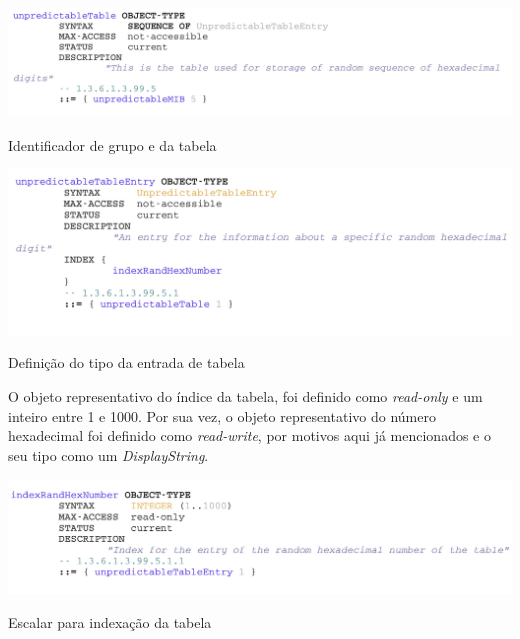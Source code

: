 \begin{center}
 	
 	\includegraphics[width=\textwidth,height=\textheight,keepaspectratio]{resources/images/faseA/mib/tables/table.png}
 	\captionsetup{type=figure, width=0.8\linewidth}
	\caption{Identificador de grupo e da tabela}
\label{fig:fasea:} 
\end{center}

\begin{center}
 	
 	\includegraphics[width=\textwidth,height=\textheight,keepaspectratio]{resources/images/faseA/mib/tables/tableentry.png}
 	\captionsetup{type=figure, width=0.8\linewidth}
	\caption{Definição do tipo da entrada de tabela}
\label{fig:fasea:} 
\end{center}

\newpage
O objeto representativo do índice da tabela, foi definido como \emph{read-only}
e um inteiro entre 1 e 1000. Por sua vez, o objeto representativo do número
hexadecimal foi definido como \emph{read-write}, por motivos aqui já mencionados
e o seu tipo como um \emph{DisplayString}. 

\begin{center}
 	
 	\includegraphics[width=\textwidth,height=\textheight,keepaspectratio]{resources/images/faseA/mib/tables/indextable.png}
 	\captionsetup{type=figure, width=0.8\linewidth}
	\caption{Escalar para indexação da tabela}
\label{fig:fasea:} 
\end{center}

